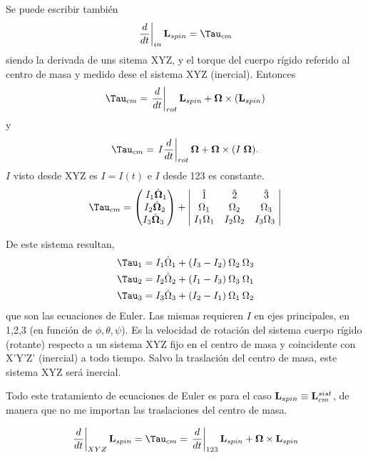 \documentclass[10pt,oneside]{CBFT_book}
\begin{document}
Se puede escribir también 
\[
	\left.\frac{d}{dt}\right|_{in} \vb{L}_{spin} = \vb{\Tau}_{cm}
\]
siendo la derivada de uns sitema XYZ, y \vb{\Tau} el torque del cuerpo rígido referido al centro de masa y
medido dese el sistema XYZ (inercial).
Entonces
\[
	\vb{\Tau}_{cm} = \left. \frac{d}{dt}\right|_{rot} \vb{L}_{spin} + \vb{\Omega} \times ( \vb{L}_{spin} )
\]
y
\[
	\vb{\Tau}_{cm} = \left. I \frac{d}{dt}\right|_{rot} \vb{\Omega} + \vb{\Omega} \times ( I \; \vb{\Omega} ).
\]
$I$ visto desde XYZ es $I=I(t)$ e $I$ desde 123 es constante.
\[
	\vb{\Tau}_{cm} =
	\begin{pmatrix} \;
		I_1 \dot{\vb{\Omega}}_1 \\
		I_2 \dot{\vb{\Omega}}_2 \\ 
		I_3 \dot{\vb{\Omega}}_3 \; \\
	\end{pmatrix}
	+
	\begin{vmatrix} \;
		\hat{1} & \hat{2} & \hat{3} \\
		\; \Omega_1 & \Omega_2 & \Omega_3 \\ 
		\; I_1\Omega_1 & I_2\Omega_2 & I_3\Omega_3 \; \\
	\end{vmatrix}	
\]

De este sistema resultan,
\begin{align*}
\Tau_1 = I_1 \dot{\Omega}_1 + (I_3-I_2) \: \Omega_2 \: \Omega_3 \\
\Tau_2 = I_2 \dot{\Omega}_2 + (I_1-I_3) \: \Omega_3 \: \Omega_1 \\
\Tau_3 = I_3 \dot{\Omega}_3 + (I_2-I_1) \: \Omega_1 \: \Omega_2
\end{align*}
que son las ecuaciones de Euler. 
Las mismas requieren $I$ en ejes principales, \vb{\Omega} en 1,2,3 (en función de $\phi,\theta,\psi$).
Es \vb{\Omega} la velocidad de rotación del sistema cuerpo rígido (rotante) respecto a un sistema XYZ
fijo en el centro de masa y coincidente con X'Y'Z' (inercial) a todo tiempo. Salvo la traslación del centro
de masa, este sistema XYZ será inercial.

Todo este tratamiento de ecuaciones de Euler es para el caso $\vb{L}_{spin} \equiv \vb{L}_{cm}^{sist}$, de
manera que no me importan las traslaciones del centro de masa.

\[
	\left.\frac{d}{dt}\right|_{XYZ} \vb{L}_{spin} = \vb{\Tau}_{cm} =
	\left.\frac{d}{dt}\right|_{123} \vb{L}_{spin} + \vb{\Omega} \times \vb{L}_{spin} 
\]

\end{document}
